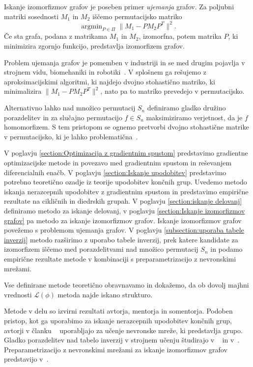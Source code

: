 \documentclass[mat2, tisk]{fmfdelo}
\newcommand{\loss}{\mathcal L}
\begin{document}
Iskanje izomorfizmov grafov je poseben primer
\emph{ujemanja} grafov. Za poljubni matriki sosednosti $M_1$ in $M_2$
iščemo permutacijsko matriko
$$
\operatorname{argmin}_{P \in \Pi} \|M_1 - P M_2 P^T\|^2.
$$
Če sta grafa, podana z matrikama $M_1$ in $M_2$, izomorfna, potem
matrika $P$, ki minimizira zgornjo funkcijo, predstavlja izomorfizem grafov.

Problem ujemanja grafov je pomemben v industriji in se med drugim pojavlja v
strojnem vidu, biomehaniki in robotiki~\cite{graphmathcingsurvey}. V
splošnem ga rešujemo
z aproksimacijskimi algoritmi, ki najdejo dvojno stohastično matriko,
ki minimalizira $ \|M_1 - P M_2 P^T\|^2$, nato pa to matriko
prevedejo v permutacijsko.

Alternativno lahko nad množico permutacij $S_n$ definiramo
gladko družino porazdelitev in za slučajno permutacijo $f \in S_n$
maksimiziramo verjetnost, da je $f$ homomorfizem. S tem
pristopom se ognemo pretvorbi dvojno stohastične matrike v permutacijsko,
ki je lahko problematična~\cite{lyzinski2015graphmatchingrelaxrisk}.

V poglavju \ref{section:Optimizacija z gradientnim spustom}
predstavimo gradientne
optimizacijske metode in povezavo med gradientnim spustom in
reševanjem diferencialnih enačb.
%
V poglavju \ref{section:Iskanje upodobitev}
predstavimo potrebno teoretično ozadje iz teorije
upodobitev končnih grup.
Uvedemo
metodo iskanja nerazcepnih upodobitev z gradientnim spustom
in predstavimo empirične rezultate na cikličnih in diedrskih grupah.
%
V poglavju \ref{section:iskanje delovanj}
definiramo metodo za iskanje delovanj,
v poglavju \ref{section:Iskanje izomorfizmov grafov}
pa metodo za iskanje
izomorfizmov grafov. Iskanje izomorfizmov grafov
povežemo s problemom ujemanja grafov.
V poglavju \ref{subsection:uporaba tabele inverzij}
metodo razširimo z uporabo tabele inverzij, prek katere
kandidate za izomorfizem iščemo med porazdelitvami nad
množico permutacij $S_n$
in podamo empirične rezultate metode v kombinaciji
s preparametrizacijo z nevronskimi mrežami.

Vse definirane metode teoretično obravnavamo in dokažemo, da
ob dovolj majhni vrednosti $\loss( \phi)$ metoda
najde iskano strukturo.

Metode v delu so izvirni rezultati
avtorja, mentorja in somentorja. Podoben pristop, kot
ga uporabimo za iskanje nerazcepnih upodobitev končnih grup, avtorji v članku
~\cite{chughtai2023neural} uporabljajo
za učenje nevronske mreže, ki predstavlja grupo.
Gladko porazdelitev nad tabelo inverzij v strojnem
učenju študirajo v
~\cite{tabela-inverzij-severo2025learningdistributionspermutationsrankings}
in v~\cite{tabela-inverzij-2020permutationlearningvialehmercodes}.
Preparametrizacijo z nevronskimi mrežami za iskanje
izomorfizmov grafov predstavijo
v~\cite{li2019graphmatchingnetworkslearning}.
\end{document}
